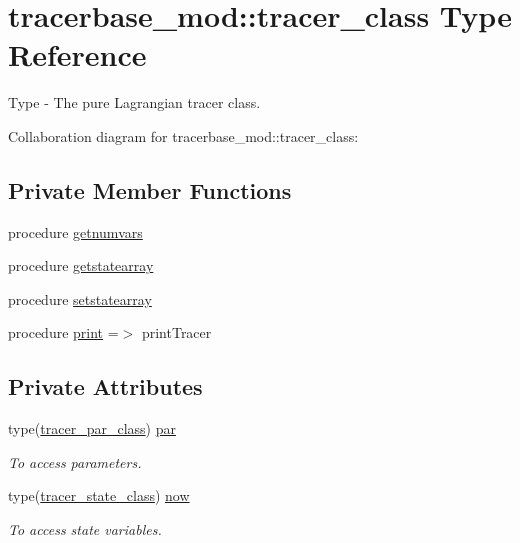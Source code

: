 \hypertarget{structtracerbase__mod_1_1tracer__class}{}\section{tracerbase\+\_\+mod\+:\+:tracer\+\_\+class Type Reference}
\label{structtracerbase__mod_1_1tracer__class}


Type -\/ The pure Lagrangian tracer class.  




Collaboration diagram for tracerbase\+\_\+mod\+:\+:tracer\+\_\+class\+:
\subsection*{Private Member Functions}
\begin{DoxyCompactItemize}
\item 
procedure \mbox{\hyperlink{structtracerbase__mod_1_1tracer__class_a5458a1e53360bfcdf51c9a677caab112}{getnumvars}}
\item 
procedure \mbox{\hyperlink{structtracerbase__mod_1_1tracer__class_ada976e2f5180866e2d5999c087b38fdc}{getstatearray}}
\item 
procedure \mbox{\hyperlink{structtracerbase__mod_1_1tracer__class_ac8e61a82082c401bff8c726e0089a5e7}{setstatearray}}
\item 
procedure \mbox{\hyperlink{structtracerbase__mod_1_1tracer__class_a1142993acbb67b4fe43c52b554165e71}{print}} =$>$ print\+Tracer
\end{DoxyCompactItemize}
\subsection*{Private Attributes}
\begin{DoxyCompactItemize}
\item 
type(\mbox{\hyperlink{structtracerbase__mod_1_1tracer__par__class}{tracer\+\_\+par\+\_\+class}}) \mbox{\hyperlink{structtracerbase__mod_1_1tracer__class_aca04297200aad39fd04e31b630d9ca50}{par}}
\begin{DoxyCompactList}\small\item\em To access parameters. \end{DoxyCompactList}\item 
type(\mbox{\hyperlink{structtracerbase__mod_1_1tracer__state__class}{tracer\+\_\+state\+\_\+class}}) \mbox{\hyperlink{structtracerbase__mod_1_1tracer__class_ad1a1e2f727ad281e2562952d6ba94526}{now}}
\begin{DoxyCompactList}\small\item\em To access state variables. \end{DoxyCompactList}\end{DoxyCompactItemize}


